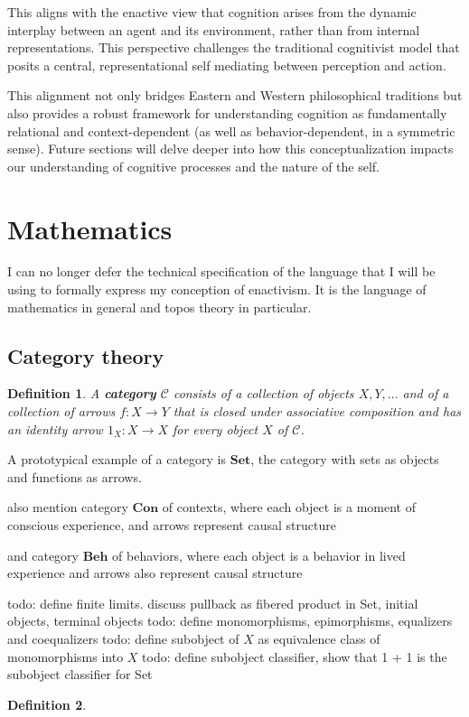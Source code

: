 \documentclass{article}
\newtheorem{definition}{Definition}[section]
\begin{document}
This aligns with the enactive view that cognition arises from the dynamic interplay between an agent and its environment, rather than from internal representations. This perspective challenges the traditional cognitivist model that posits a central, representational self mediating between perception and action.

This alignment not only bridges Eastern and Western philosophical traditions but also provides a robust framework for understanding cognition as fundamentally relational and context-dependent (as well as behavior-dependent, in a symmetric sense). Future sections will delve deeper into how this conceptualization impacts our understanding of cognitive processes and the nature of the self.

\section{Mathematics}
I can no longer defer the technical specification of the language that I will be using to formally express my conception of enactivism. It is the language of mathematics in general and topos theory in particular.

\subsection{Category theory}

\begin{definition} A \textbf{category} $\mathcal{C}$ consists of a collection of objects $X, Y, ...$ and of a collection of arrows $f \colon X \to Y$ that is closed under associative composition and has an identity arrow $1_X \colon X \to X$ for every object $X$ of $\mathcal{C}$.
\end{definition}

A prototypical example of a category is $\mathbf{Set}$, the category with sets as objects and functions as arrows.

also mention category $\mathbf{Con}$ of contexts, where each object is a moment of conscious experience, and arrows represent causal structure

and category $\mathbf{Beh}$ of behaviors, where each object is a behavior in lived experience and arrows also represent causal structure

todo: define finite limits. discuss pullback as fibered product in Set, initial objects, terminal objects 
todo: define monomorphisms, epimorphisms, equalizers and coequalizers 
todo: define subobject of $X$ as equivalence class of monomorphisms into $X$ 
todo: define subobject classifier, show that 1 + 1 is the subobject classifier for Set 
\begin{definition}

\end{definition}
\end{document}
